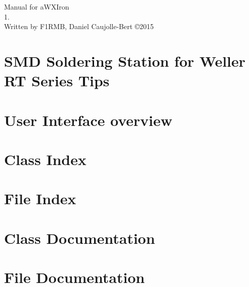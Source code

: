 \documentclass[twoside]{book}
\newcommand{\clearemptydoublepage}{%
  \newpage{\pagestyle{empty}\cleardoublepage}%
}
\begin{document}
\hypersetup{pageanchor=false}
\begin{titlepage}
\vspace*{7cm}
\begin{center}%
{\Large Manual for a\-W\-X\-Iron \\[1ex]\large 1. }\\
\vspace*{1cm}
{\large Written by F1RMB, Daniel Caujolle-Bert \copyright 2015 }\\
\vspace*{1cm}
\end{center}
\end{titlepage}
\clearemptydoublepage
\tableofcontents
\clearemptydoublepage
{}
\hypersetup{pageanchor=true}

\chapter{S\-M\-D Soldering Station for Weller R\-T Series Tips}
\label{mainpage}
\hypertarget{mainpage}{}

\chapter{User Interface overview}
\label{_u_i}
\hypertarget{_u_i}{}

\chapter{Class Index}

\chapter{File Index}

\chapter{Class Documentation}




\chapter{File Documentation}























\newpage
{}
{}
\printindex
\end{document}
